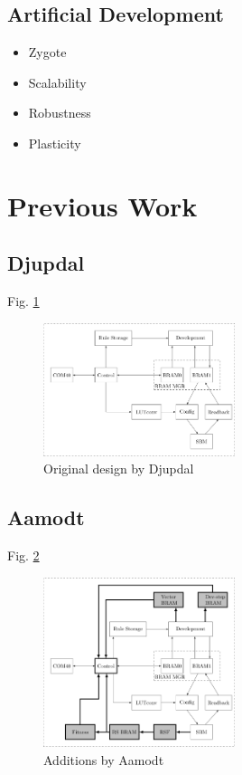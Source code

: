 \documentclass[a4paper]{IEEEtran}
\begin{document}
\subsection{Artificial Development \cite{harding2008artificial}}
\begin{itemize}
    \item Zygote
    \item Scalability
    \item Robustness
    \item Plasticity
\end{itemize}

\section{Previous Work}

\subsection{Djupdal \cite{djupdal2003sblock}}

Fig. \ref{fig:ca-djupdal}

\begin{figure}[h!]
    \centering
    \includegraphics[width=0.5\textwidth]{figures/ca-djupdal}
    \caption{Original design by Djupdal}
    \label{fig:ca-djupdal}
\end{figure}

\subsection{Aamodt \cite{aamodt2005sblock}}

Fig. \ref{fig:ca-aamodt}

\begin{figure}[h!]
    \centering
    \includegraphics[width=0.5\textwidth]{figures/ca-aamodt}
    \caption{Additions by Aamodt}
    \label{fig:ca-aamodt}
\end{figure}
\end{document}
